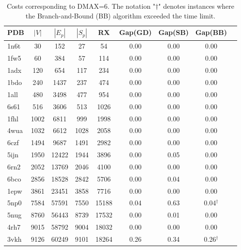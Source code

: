 \begin{table}
\caption{Costs corresponding to DMAX=6. The notation "$\dag$" denotes instances where the Branch-and-Bound (BB) algorithm exceeded the time limit.}
\label{tab:cost_6}
\begin{tabular}{lcccccccc}
\toprule
PDB & $|V|$ & $|E_p|$ & $|S_p|$ & RX & Gap(GD) & Gap(SB) & Gap(BB) \\
\midrule
1n6t & 30 & 152 & 27 & 54 & 0.00 & 0.00 & 0.00 \\
1fw5 & 60 & 384 & 57 & 114 & 0.00 & 0.00 & 0.00 \\
1adx & 120 & 654 & 117 & 234 & 0.00 & 0.00 & 0.00 \\
1bdo & 240 & 1437 & 237 & 474 & 0.00 & 0.00 & 0.00 \\
1all & 480 & 3498 & 477 & 954 & 0.00 & 0.00 & 0.00 \\
6s61 & 516 & 3606 & 513 & 1026 & 0.00 & 0.00 & 0.00 \\
1fhl & 1002 & 6811 & 999 & 1998 & 0.00 & 0.00 & 0.00 \\
4wua & 1032 & 6612 & 1028 & 2058 & 0.00 & 0.00 & 0.00 \\
6czf & 1494 & 9687 & 1491 & 2982 & 0.00 & 0.00 & 0.00 \\
5ijn & 1950 & 12422 & 1944 & 3896 & 0.00 & 0.05 & 0.00 \\
6rn2 & 2052 & 13769 & 2046 & 4100 & 0.00 & 0.00 & 0.00 \\
6bco & 2856 & 18528 & 2842 & 5706 & 0.00 & 0.04 & 0.00 \\
1epw & 3861 & 23451 & 3858 & 7716 & 0.00 & 0.00 & 0.00 \\
5np0 & 7584 & 57591 & 7550 & 15188 & 0.04 & 0.63 & 0.04$^\dag$ \\
5nug & 8760 & 56443 & 8739 & 17532 & 0.00 & 0.01 & 0.00 \\
4rh7 & 9015 & 58792 & 9004 & 18032 & 0.00 & 0.00 & 0.00 \\
3vkh & 9126 & 60249 & 9101 & 18264 & 0.26 & 0.34 & 0.26$^\dag$ \\
\bottomrule
\end{tabular}
\end{table}
